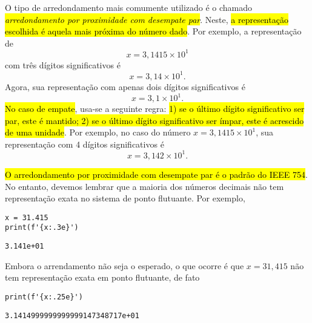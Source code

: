 O tipo de arredondamento mais comumente utilizado é o chamado \hl{\emph{arredondamento por proximidade com desempate par}}. Neste, \hl{a representação escolhida é aquela mais próxima do número dado}. Por exemplo, a representação de 
\begin{equation}
  x=3,1415\times 10^1
\end{equation}
com três dígitos significativos é 
\begin{equation}
  x=3,14\times 10^{1}. 
\end{equation}
Agora, sua representação com apenas dois dígitos significativos é
\begin{equation}
  x=3,1\times 10^{1}.
\end{equation}
\hl{No caso de empate}, usa-se a seguinte regra: \hl{1) se o último dígito significativo ser par, este é mantido; 2) se o último dígito significativo ser ímpar, este é acrescido de uma unidade}. Por exemplo, no caso do número $x=3,1415\times 10^1$, sua representação com 4 dígitos significativos é
\begin{equation}
  x = 3,142\times 10^1.
\end{equation}

\begin{obs}\label{obs:arredondamento_ieee754}
  \hl{O arredondamento por proximidade com desempate par é o padrão do IEEE 754}. No entanto, devemos lembrar que a maioria dos números decimais não tem representação exata no sistema de ponto flutuante. Por exemplo,

\begin{lstlisting}
x = 31.415
print(f'{x:.3e}')
\end{lstlisting}

\begin{verbatim}
3.141e+01
\end{verbatim}

  Embora o arrendamento não seja o esperado, o que ocorre é que $x = 31,415$ não tem representação exata em ponto flutuante, de fato

\begin{lstlisting}
print(f'{x:.25e}')
\end{lstlisting}

\begin{verbatim}
3.1414999999999999147348717e+01
\end{verbatim}
\end{obs}

